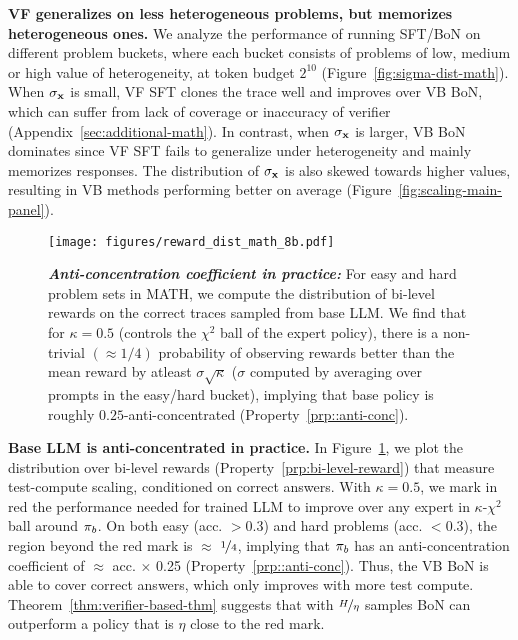 \textbf{VF generalizes on less heterogeneous problems, but memorizes heterogeneous ones.} We analyze the performance of running SFT/BoN on different problem buckets, where each bucket consists of problems of low, medium or high value of heterogeneity, at token budget $2^{10}$ (Figure~\ref{fig:sigma-dist-math}). When $\sigma_{\mathbf{x}}$ is small, VF SFT clones the trace well and improves over VB BoN, which can suffer from lack of coverage or inaccuracy of verifier (Appendix~\ref{sec:additional-math}). In contrast, when $\sigma_{\mathbf{x}}$ is larger, VB BoN dominates since VF SFT fails to generalize under heterogeneity and mainly memorizes responses.
The distribution of $\sigma_{\mathbf{x}}$ is also skewed towards higher values, resulting in VB methods performing better on average (Figure~\ref{fig:scaling-main-panel}).  
\begin{figure}[!ht]
    \centering
    \texttt{[image: figures/reward\_dist\_math\_8b.pdf]}
    \vspace{-0.1cm}    
    \caption{\footnotesize{\textbf{\emph{Anti-concentration coefficient in practice:}} For easy and hard problem sets in MATH, we compute the distribution of bi-level rewards on the correct traces sampled from base LLM. We find that for $\kappa = 0.5$ (controls the $\chi^2$ ball of the expert policy), there is a non-trivial  $(\approx 1/4)$ probability of observing rewards better than the mean reward by atleast $\sigma \sqrt{\kappa}$ ($\sigma$ computed by averaging over prompts in the easy/hard bucket), implying that base policy is roughly $0.25$-anti-concentrated (Property~\ref{prp::anti-conc}).}}
    \vspace{-0.25cm}
    \label{fig:anti-conc-math}
\end{figure}

\textbf{Base LLM is anti-concentrated in practice.} In Figure~\ref{fig:anti-conc-math}, we plot the distribution over bi-level rewards (Property~\ref{prp:bi-level-reward}) that measure test-compute scaling, conditioned on correct answers. With $\kappa=0.5$, we mark in red the performance needed for  trained LLM to improve over any expert in $\kappa$-$\chi^2$ ball around $\pi_b$. On both easy (acc. $>$$0.3$) and hard problems (acc. $<$$0.3$), the region beyond the red mark is $\approx$ $\nicefrac{1}{4}$, implying that $\pi_b$ has an anti-concentration coefficient of $\approx$ acc. $\times$ 0.25 (Property~\ref{prp::anti-conc}). Thus, the VB BoN is able to cover correct answers, which only improves with more test compute. Theorem~\ref{thm:verifier-based-thm} suggests that with $\nicefrac{H}{\eta}$ samples BoN can outperform a policy that is $\eta$ close to the red mark.



